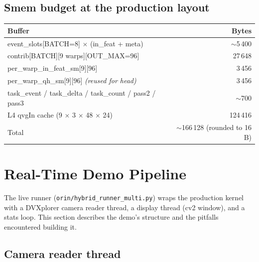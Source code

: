 \documentclass[11pt,a4paper]{article}
\begin{document}
\subsection{Smem budget at the production layout}

\begin{tabularx}{\linewidth}{lr}
\toprule
\textbf{Buffer} & \textbf{Bytes} \\
\midrule
event\_slots[BATCH=8] $\times$ (in\_feat + meta)             & $\sim$5\,400 \\
contrib[BATCH][9 warps][OUT\_MAX=96]                          & 27\,648 \\
per\_warp\_in\_feat\_sm[9][96]                                & 3\,456 \\
per\_warp\_qh\_sm[9][96] \emph{(reused for head)}             & 3\,456 \\
task\_event / task\_delta / task\_count / pass2 / pass3      & $\sim$700 \\
L4 qvgIn cache (9 $\times$ 3 $\times$ 48 $\times$ 24)         & 124\,416 \\
\midrule
Total                                                         & $\sim$166\,128 (rounded to 16 B) \\
\bottomrule
\end{tabularx}

\section{Real-Time Demo Pipeline}

The live runner (\texttt{orin/hybrid\_runner\_multi.py}) wraps the
production kernel with a DVXplorer camera reader thread, a display
thread (cv2 window), and a stats loop. This section describes the
demo's structure and the pitfalls encountered building it.

\subsection{Camera reader thread}
\end{document}
